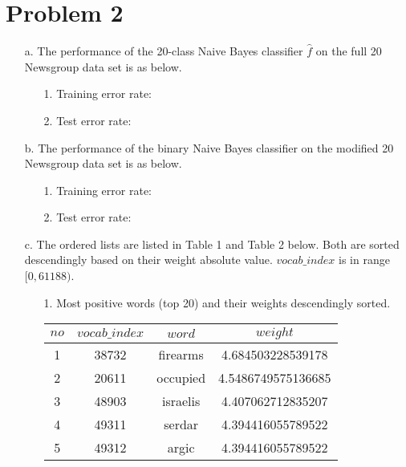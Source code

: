 \documentclass[twoside]{homework}
\begin{document}
\section*{Problem 2}
\begin{itemize}
    \item [a.] The performance of the 20-class Naive Bayes classifier $\hat{f}$ on the full 20 Newsgroup data set is as below.
        \begin{itemize}
            \item [1.] Training error rate: 
            \item [2.] Test error rate: 
        \end{itemize}
    \item [b.] The performance of the binary Naive Bayes classifier on the modified 20 Newsgroup data set is as below.
        \begin{itemize}
            \item [1.] Training error rate: 
            \item [2.] Test error rate: 
        \end{itemize}
    \item [c.] The ordered lists are listed in Table 1 and Table 2 below. Both are sorted descendingly based on their weight absolute value.  $vocab\_index$ is in range $[0, 61188)$.
        \begin{itemize}
            \item [1.] Most positive words (top 20) and their weights descendingly sorted.
            \begin{table}[h!]
                \centering
                \begin{tabular}{||c c c c||}
                    \hline
                    $no$ & $vocab\_index$ & $word$ & $weight$ \\ [1ex]
                    \hline\hline
                    1 & 38732 & firearms & 4.684503228539178\\
                    \hline
                    2 & 20611 & occupied & 4.5486749575136685\\
                    \hline
                    3 & 48903 & israelis & 4.407062712835207\\
                    \hline
                    4 & 49311 & serdar & 4.394416055789522\\
                    \hline
                    5 & 49312 & argic & 4.394416055789522\\

\end{tabular}
\end{table}
\end{itemize}
\end{itemize}
\end{document}
